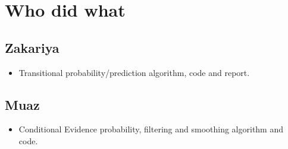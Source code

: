\documentclass[11pt]{article}
\begin{document}
\section*{Who did what}
\label{sec:orgd09173e}
\subsection*{Zakariya}
\label{sec:org61b47c8}
\begin{itemize}
\item Transitional probability/prediction algorithm, code and report.
\end{itemize}
\subsection*{Muaz}
\label{sec:orga79b48d}
\begin{itemize}
\item Conditional Evidence probability, filtering and smoothing algorithm and code.
\end{itemize}
\end{document}
